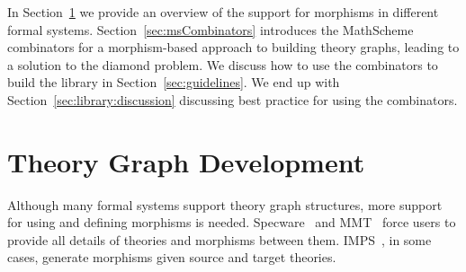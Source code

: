 In Section~\ref{sec:thry_graph_in_action} we provide an overview of the support for morphisms in different formal systems. Section~\ref{sec:msCombinators} introduces the MathScheme combinators for a morphism-based approach to building theory graphs, leading to a solution to the diamond problem. We discuss how to use the combinators to build the library in Section~\ref{sec:guidelines}. We end up with Section~\ref{sec:library:discussion} discussing best practice for using the combinators. 

\begin{comment}
To test our generation algorithms, we needed a large library of equational theories. As we have discussed in Section~\ref{sec:broader_context}, we work in the favor of a library organized as a theory graph, believing that it leverages the structure of mathematical knowledge. Morphisms of the graph are the means to relating the different theories. In this section, we present our approach to building a library that emphasizes these connections. 

In Section~\ref{sec:thry_based_libs} we discuss the motivation behind building such a library. In Section~\ref{sec:ms_combinators} we present the combinators used in building it and discuss how they are morphism based. Section~\ref{sec:lib_implementation}, discusses the challenges of the implementation of the combinators to build a theory graph. We finally show some interesting cases of library definitions in Section~\ref{sec:interesting_cases}. 
\end{comment}


\section{Theory Graph Development}
\label{sec:thry_graph_in_action}

Although many formal systems support theory graph structures, more support for using and defining morphisms is needed. 
Specware~\cite{Smith99} and MMT~\cite{MMT} force users to provide all details of theories and morphisms between them. IMPS~\cite{farmer1993imps}, in some cases, generate morphisms given source and target theories. 


